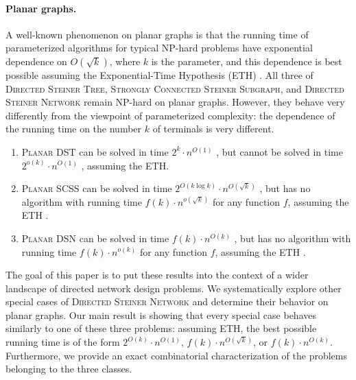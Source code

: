 \paragraph{Planar graphs.} A well-known phenomenon on planar graphs is that the running time of parameterized algorithms for typical NP-hard problems have exponential dependence on $O(\sqrt{k})$, where $k$ is the parameter, and this dependence is best possible assuming the Exponential-Time Hypothesis (ETH)
\cite{DBLP:conf/focs/MarxPP18,ChitnisFHM20,DBLP:conf/focs/FominLMPPS16,DBLP:journals/talg/MarxP22,DBLP:conf/soda/KleinM14,DBLP:conf/icalp/KleinM12,DBLP:conf/icalp/Marx12,DBLP:conf/fsttcs/LokshtanovSW12,DBLP:journals/algorithmica/Verdiere17,DBLP:conf/stoc/Nederlof20a,10.5555/2815661}. All three of \textsc{Directed Steiner Tree},  \textsc{Strongly Connected Steiner Subgraph}, 
and \textsc{Directed Steiner Network} remain NP-hard on planar graphs. However, they behave very differently from the viewpoint of parameterized complexity: the dependence of the running time on the number $k$ of terminals is very different.
\medskip

\begin{mdframed}[style=highlight,frametitle={Our starting point}] 
     
    \begin{enumerate}    
\item \textsc{Planar DST} can be solved in time $2^k\cdot n^{O(1)}$ \cite{DBLP:conf/stoc/BjorklundHKK07}, but cannot be solved in time $2^{o(k)}\cdot n^{O(1)}$ \cite{DBLP:conf/focs/MarxPP18}, assuming the ETH.
\item \textsc{Planar SCSS} can be solved in time $2^{O(k\log k)}\cdot n^{O(\sqrt{k})}$ \cite{ChitnisFHM20}, but has no algorithm with running time $f(k) \cdot n^{o(\sqrt{k})}$ for any function $f$, assuming the ETH \cite{ChitnisFHM20}.
\item \textsc{Planar DSN} can be solved in time $f(k) \cdot n^{O({k})}$ \cite{eiben_et_al}, but has no algorithm with running time $f(k) \cdot n^{o({k})}$ for any function $f$, assuming the ETH \cite{ChitnisFHM20}.
\end{enumerate}
\end{mdframed}
\medskip

The goal of this paper is to put these results into the context of a wider landscape of directed network design problems. We systematically explore other special cases of  \textsc{Directed Steiner Network} and determine their behavior on planar graphs. Our main result is showing that every special case behaves similarly to one of these three problems: assuming ETH, the best possible running time is of the form $2^{O(k)}\cdot n^{O(1)}$, $f(k) \cdot n^{O(\sqrt{k})}$, or $f(k)\cdot n^{O(k)}$. Furthermore, we provide an exact combinatorial characterization of the problems belonging to the three classes.
\clearpage

